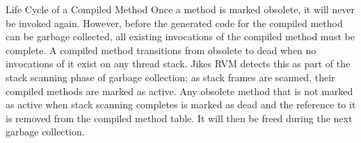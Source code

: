 \begin{section}{Life Cycle of a Compiled Method}
Once a method is marked obsolete, it will never be invoked again.  However, before the generated code for the compiled method can be garbage collected, all existing invocations of the compiled method must be complete.  A compiled method transitions from obsolete to  dead when no invocations of it exist on any thread stack.  Jikes RVM detects this as part of the stack scanning phase of garbage collection; as stack frames are scanned, their compiled methods are marked as active.  Any obsolete method that is not marked as active when stack scanning completes is marked as dead and the reference to it is removed from the compiled method table.  It will then be freed during the next garbage collection.

\end{section}